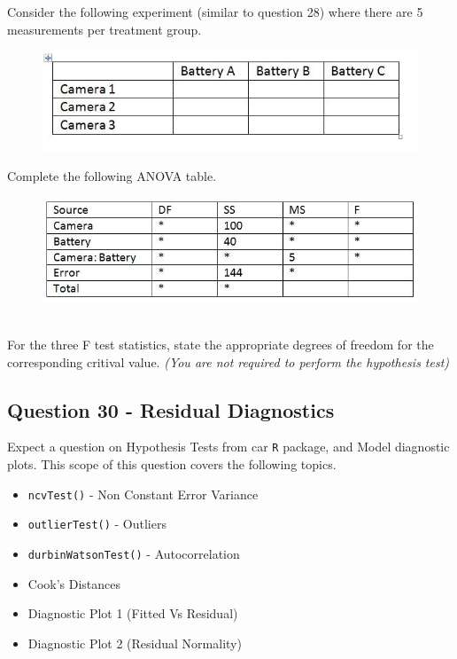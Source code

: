 \documentclass[a4paper,12pt]{article}
\begin{document}
Consider the following experiment (similar to question 28) where there are 5 measurements per treatment group.
\begin{figure}[h!]
	\centering
	\includegraphics[width=0.8\linewidth]{images/Q29Review}
\end{figure}
Complete the following ANOVA table.\\ \bigskip
\begin{figure}[h!]
	\centering
	\includegraphics[width=0.8\linewidth]{images/Q29Review2}
\end{figure}\\


For the three F test statistics, state the appropriate degrees of freedom for the corresponding critival value. \textit{(You are not required to perform the hypothesis test)}
\newpage
\subsection*{Question 30 - Residual Diagnostics}
Expect a question on Hypothesis Tests from car \texttt{R} package, and Model diagnostic plots. This scope of this question covers the following topics.
\begin{itemize}
	\item \texttt{ncvTest()} - Non Constant Error Variance
	\item \texttt{outlierTest()} - Outliers
	\item \texttt{durbinWatsonTest()}  - Autocorrelation
	\item Cook's Distances
	\item Diagnostic Plot 1 (Fitted Vs Residual)
	\item Diagnostic Plot 2 (Residual Normality) 
\end{itemize}
\newpage
\end{document}
